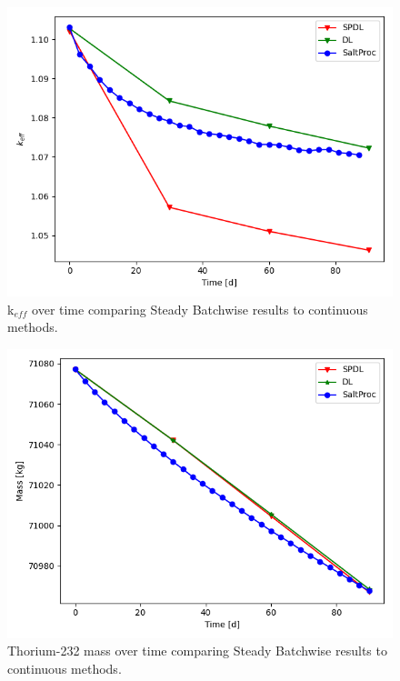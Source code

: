\begin{figure}[H]
  \centering
  \includegraphics[scale=0.7]{images/soln-1-2-keff.png}
  \caption{k$_{eff}$ over time comparing Steady Batchwise results to continuous methods.}
   \label{fig:steady-compare-keff}
\end{figure}

\begin{figure}[H]
  \centering
  \includegraphics[scale=0.7]{images/soln-1-2-th232.png}
  \caption{Thorium-232 mass over time comparing Steady Batchwise results to continuous methods.}
   \label{fig:steady-compare-th232}
\end{figure}

